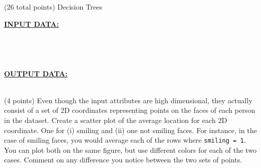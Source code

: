 \documentclass[12pt]{article}
\begin{document}
\begin{question}{(26 total points) Decision Trees}
\begin{subquestion}
\begin{answerbox}{30em}
\large{\textbf{\underline{INPUT DATA:}}}\\
\\
\\
\\
\\
\large{\textbf{\underline{OUTPUT DATA:}}}\\
\\
\end{answerbox}



\end{subquestion}


%
%
\begin{subquestion}{(4 points) Even though the input attributes are high dimensional, they actually consist of a set of 2D coordinates representing points on the faces of each person in the dataset. 
Create a scatter plot of the average location for each 2D coordinate. One for (i) smiling and (ii) one not smiling faces. 
For instance, in the case of smiling faces, you would average each of the rows where \texttt{smiling = 1}. 
You can plot both on the same figure, but use different colors for each of the two cases. 
Comment on any difference you notice between the two sets of points. \\
}



\end{subquestion}
\end{question}
\end{document}
